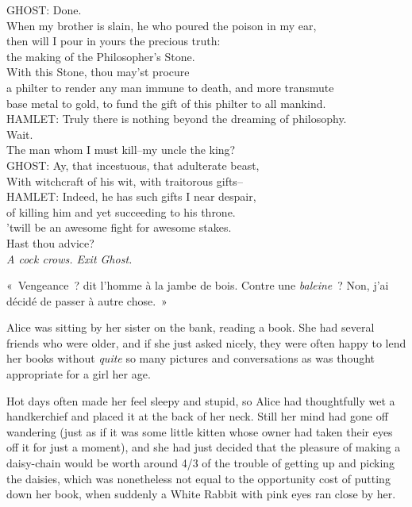 \begin{playdialog}
GHOST: Done.\\
When my brother is slain, he who poured the poison in my ear,\\
then will I pour in yours the precious truth:\\
the making of the Philosopher’s Stone.\\
With this Stone, thou may’st procure\\
a philter to render any man immune to death, and more transmute\\ base metal to gold, to fund the gift of this philter to all mankind.\\

HAMLET: Truly there is nothing beyond the dreaming of philosophy.\\ Wait.\\ The man whom I must kill--my uncle the king?\\

GHOST: Ay, that incestuous, that adulterate beast,\\
With witchcraft of his wit, with traitorous gifts--\\

HAMLET: Indeed, he has such gifts I near despair,\\
of killing him and yet succeeding to his throne.\\
’twill be an awesome fight for awesome stakes.\\
Hast thou advice?\\

\emph{A cock crows. Exit Ghost.}
\end{playdialog}


«~Vengeance~? dit l'homme à la jambe de bois. Contre une \emph{baleine}~? Non, j'ai décidé de passer à autre chose.~»


Alice was sitting by her sister on the bank, reading a book. She had several friends who were older, and if she just asked nicely, they were often happy to lend her books without \emph{quite} so many pictures and conversations as was thought appropriate for a girl her age.

Hot days often made her feel sleepy and stupid, so Alice had thoughtfully wet a handkerchief and placed it at the back of her neck. Still her mind had gone off wandering (just as if it was some little kitten whose owner had taken their eyes off it for just a moment), and she had just decided that the pleasure of making a daisy-chain would be worth around 4/3 of the trouble of getting up and picking the daisies, which was nonetheless not equal to the opportunity cost of putting down her book, when suddenly a White Rabbit with pink eyes ran close by her.

